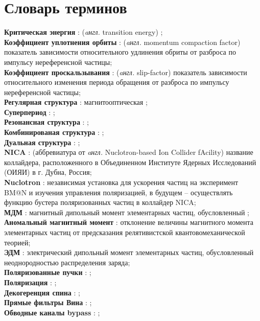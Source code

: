 \chapter*{Словарь терминов}             %

\textbf{Критическая энергия} : (\textit{aнгл.} transition energy) ;\\
\textbf{Коэффициент уплотнения орбиты} : (\textit{aнгл.} momentum compaction factor) показатель зависимости относительного удлинения обриты от разброса по импульсу нереференсной частицы;\\ 
\textbf{Коэффициент проскальзывания} :  (\textit{aнгл.} slip-factor) показатель зависимости относительного изменения периода обращения от разброса по импульсу нереференсной частицы;\\
\textbf{Регулярная структура} : магнитооптическая ;\\
\textbf{Суперпериод} :  ;\\
\textbf{Резонансная структура} : ;\\
\textbf{Комбинированая структура} : ;\\
\textbf{Дуальная структура} : ;\\
\textbf{NICA} : (аббревиатура от \textit{aнгл.} Nuclotron-based Ion Collider fAcility) название коллайдера, расположенного в Объединенном Институте Ядерных Исследований (ОИЯИ) в г. Дубна, Россия;\\
\textbf{Nuclotron} : независимая установка для ускорения частиц на эксперимент BM@N и изучения управления поляризацией, в будущем – осуществлять функцию бустера поляризованных частиц в коллайдер NICA;\\
\textbf{МДМ} : магнитный дипольный момент элементарных частиц, обусловленный ;\\
\textbf{Аномальный магнитный момент} : отклонение величины магнитного момента элементарных частиц от предсказания релятивистской квантовомеханической теорией;\\
\textbf{ЭДМ} : электрический дипольный момент элементарных частиц, обусловленный неоднородностью распределения заряда;\\
\textbf{Поляризованные пучки} : ;\\
\textbf{Поляризация} : ;\\
\textbf{Декогеренция спина} : ;\\
\textbf{Прямые фильтры Вина} : ;\\
\textbf{Обводные каналы bypass} : ;\\
